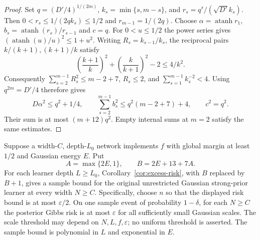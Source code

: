 \begin{proof}
Set $q=(D'/4)^{1/(2m)}$, $k_s=\min\{s,m-s\}$, and
$r_s=q^s/(\sqrt{D'}k_s)$. Then $0<r_s\le1/(2qk_s)\le1/2$ and
$r_{m-1}=1/(2q)$. Choose
$\alpha=\operatorname{atanh}r_1$,
$b_s=\operatorname{atanh}(r_s)/r_{s-1}$ and $c=q$.
For $0<u\le1/2$ the power series gives
$(\operatorname{atanh}(u)/u)^2\le1+u^2$.
Writing $R_s=k_{s-1}/k_s$, the reciprocal pairs
$k/(k+1),(k+1)/k$ satisfy
\[
 \left(\frac{k+1}{k}\right)^2+
 \left(\frac{k}{k+1}\right)^2-2\le4/k^2.
\]
Consequently $\sum_{s=2}^{m-1}R_s^2\le m-2+7$,
$R_s\le2$, and $\sum_{s=1}^{m-1}k_s^{-2}<4$.
Using $q^{2m}=D'/4$ therefore gives
\[
 D\alpha^2\le q^2+1/4,\qquad
 \sum_{s=2}^{m-1}b_s^2\le q^2(m-2+7)+4,\qquad c^2=q^2.
\]
Their sum is at most $(m+12)q^2$. Empty internal sums at $m=2$
satisfy the same estimates.
\end{proof}

\begin{corollary}
\label{cor:padded-strongprior}
Suppose a width-$C$, depth-$L_0$ network implements $f$ with global margin
at least $1/2$ and Gaussian energy $E$. Put
\[
 A=\max\{2E,1\},\qquad B=2E+13+7A.
\]
For each learner depth $L\ge L_0$, Corollary~\ref{cor:excess-risk}, with
$B$ replaced by $B+1$, gives a sample bound for the original unrestricted
Gaussian strong-prior learner at every width $N\ge C$.
Specifically, choose $n$ so that the displayed risk bound is at most
$\varepsilon/2$. On one sample event of probability $1-\delta$, for each
$N\ge C$ the posterior Gibbs risk is at most $\varepsilon$ for all
sufficiently small Gaussian scales. The scale threshold may depend on
$N,L,f,\varepsilon$; no uniform threshold is asserted.
The sample bound is polynomial in $L$ and exponential in $E$.
\end{corollary}

